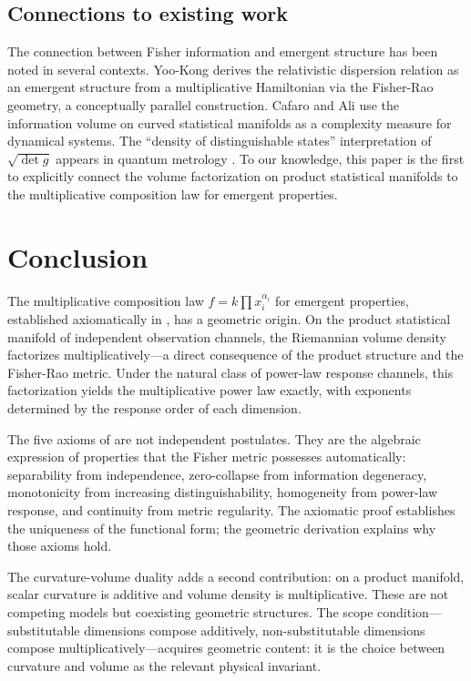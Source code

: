 \documentclass[12pt, a4paper]{article}
\theoremstyle{definition}
\theoremstyle{remark}
\begin{document}
\subsection{Connections to existing work}

The connection between Fisher information and emergent structure has been noted in several contexts. Yoo-Kong \cite{yookong2026} derives the relativistic dispersion relation as an emergent structure from a multiplicative Hamiltonian via the Fisher-Rao geometry, a conceptually parallel construction. Cafaro and Ali \cite{cafaro2008} use the information volume on curved statistical manifolds as a complexity measure for dynamical systems. The ``density of distinguishable states'' interpretation of $\sqrt{\det g}$ appears in quantum metrology \cite{qdistinguishable}. To our knowledge, this paper is the first to explicitly connect the volume factorization on product statistical manifolds to the multiplicative composition law for emergent properties.

\section{Conclusion}\label{sec:conclusion}

The multiplicative composition law $f = k \prod x_i^{\alpha_i}$ for emergent properties, established axiomatically in \cite{kirsch2026mc}, has a geometric origin. On the product statistical manifold of independent observation channels, the Riemannian volume density factorizes multiplicatively---a direct consequence of the product structure and the Fisher-Rao metric. Under the natural class of power-law response channels, this factorization yields the multiplicative power law exactly, with exponents determined by the response order of each dimension.

The five axioms of \cite{kirsch2026mc} are not independent postulates. They are the algebraic expression of properties that the Fisher metric possesses automatically: separability from independence, zero-collapse from information degeneracy, monotonicity from increasing distinguishability, homogeneity from power-law response, and continuity from metric regularity. The axiomatic proof establishes the uniqueness of the functional form; the geometric derivation explains why those axioms hold.

The curvature-volume duality adds a second contribution: on a product manifold, scalar curvature is additive and volume density is multiplicative. These are not competing models but coexisting geometric structures. The scope condition---substitutable dimensions compose additively, non-substitutable dimensions compose multiplicatively---acquires geometric content: it is the choice between curvature and volume as the relevant physical invariant.
\end{document}
